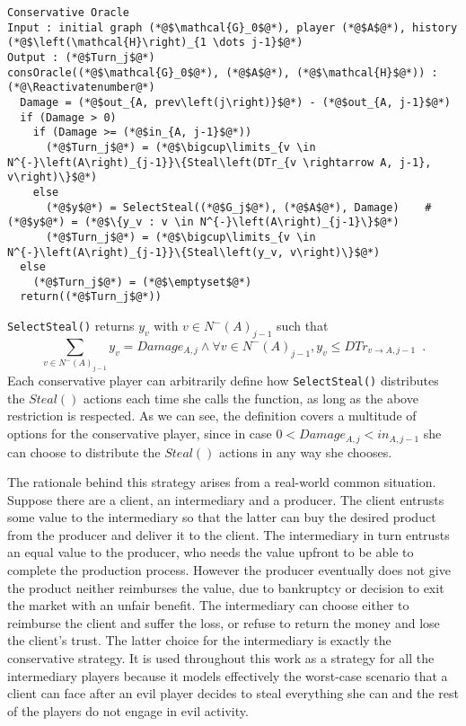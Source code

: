 \documentclass[11pt]{llncs}
\makeatletter
\newcommand*\Suppressnumber{%
  \lst@AddToHook{OnNewLine}{%
    \let\thelstnumber\relax%
     \advance\c@lstnumber-\@ne\relax%
    }%
}
\theoremstyle{definition}
\makeatother
\begin{document}
     \Suppressnumber
     \begin{lstlisting}[label=conservativeoracle, style=numbers]
Conservative Oracle
Input : initial graph (*@$\mathcal{G}_0$@*), player (*@$A$@*), history (*@$\left(\mathcal{H}\right)_{1 \dots j-1}$@*)
Output : (*@$Turn_j$@*)
consOracle((*@$\mathcal{G}_0$@*), (*@$A$@*), (*@$\mathcal{H}$@*)) : (*@\Reactivatenumber@*)
  Damage = (*@$out_{A, prev\left(j\right)}$@*) - (*@$out_{A, j-1}$@*)
  if (Damage > 0)
    if (Damage >= (*@$in_{A, j-1}$@*))
      (*@$Turn_j$@*) = (*@$\bigcup\limits_{v \in N^{-}\left(A\right)_{j-1}}\{Steal\left(DTr_{v \rightarrow A, j-1}, v\right)\}$@*)
    else
      (*@$y$@*) = SelectSteal((*@$G_j$@*), (*@$A$@*), Damage)    #(*@$y$@*) = (*@$\{y_v : v \in N^{-}\left(A\right)_{j-1}\}$@*)
      (*@$Turn_j$@*) = (*@$\bigcup\limits_{v \in N^{-}\left(A\right)_{j-1}}\{Steal\left(y_v, v\right)\}$@*)
  else
    (*@$Turn_j$@*) = (*@$\emptyset$@*)
  return((*@$Turn_j$@*))
     \end{lstlisting}
     \texttt{SelectSteal()} returns $y_v$ with $v \in N^{-}\left(A\right)_{j-1}$ such that
     \begin{equation}
        \sum\limits_{v \in N^{-}\left(A\right)_{j-1}}y_v = Damage_{A, j} \wedge \forall v \in N^{-}\left(A\right)_{j-1},
        y_v \leq DTr_{v \rightarrow A, j-1} \enspace.
     \end{equation}
     Each conservative player can arbitrarily define how \texttt{SelectSteal()} distributes the $Steal\left(\right)$ actions
     each time she calls the function, as long as the above restriction is respected. As we can see, the definition covers a
     multitude of options for the conservative player, since in case $0 < Damage_{A,j} < in_{A,j-1}$ she can choose to
     distribute the $Steal\left(\right)$ actions in any way she chooses.

     The rationale behind this strategy arises from a real-world common situation. Suppose there are a client, an
     intermediary and a producer. The client entrusts some value to the intermediary so that the latter can buy the desired
     product from the producer and deliver it to the client. The intermediary in turn entrusts an equal value to the
     producer, who needs the value upfront to be able to complete the production process. However the producer eventually
     does not give the product neither reimburses the value, due to bankruptcy or decision to exit the market with an unfair
     benefit. The intermediary can choose either to reimburse the client and suffer the loss, or refuse to return the money
     and lose the client's trust. The latter choice for the intermediary is exactly the conservative strategy. It is used
     throughout this work as a strategy for all the intermediary players because it models effectively the worst-case
     scenario that a client can face after an evil player decides to steal everything she can and the rest of the players do
     not engage in evil activity.
\end{document}
